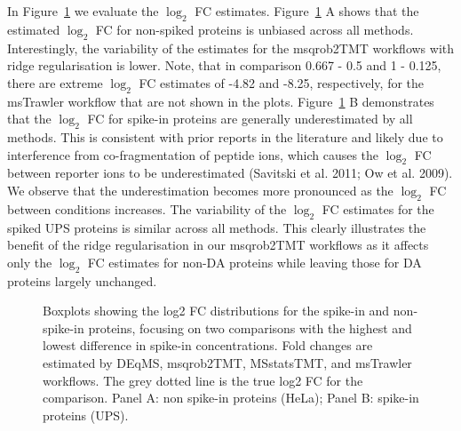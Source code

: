 \documentclass[
  letterpaper,
  DIV=11,
  numbers=noendperiod]{scrartcl}
\begin{document}
In Figure~\ref{fig-fold_change_spike} we evaluate the \(\log_2\) FC
estimates. Figure~\ref{fig-fold_change_spike} A shows that the estimated
\(\log_2\) FC for non-spiked proteins is unbiased across all methods.
Interestingly, the variability of the estimates for the msqrob2TMT
workflows with ridge regularisation is lower. Note, that in comparison
0.667 - 0.5 and 1 - 0.125, there are extreme \(\log_2\) FC estimates of
-4.82 and -8.25, respectively, for the msTrawler workflow that are not
shown in the plots. Figure~\ref{fig-fold_change_spike} B demonstrates
that the \(\log_2\) FC for spike-in proteins are generally
underestimated by all methods. This is consistent with prior reports in
the literature and likely due to interference from co-fragmentation of
peptide ions, which causes the \(\log_2\) FC between reporter ions to be
underestimated (Savitski et al. 2011; Ow et al. 2009). We observe that
the underestimation becomes more pronounced as the \(\log_2\) FC between
conditions increases. The variability of the \(\log_2\) FC estimates for
the spiked UPS proteins is similar across all methods. This clearly
illustrates the benefit of the ridge regularisation in our msqrob2TMT
workflows as it affects only the \(\log_2\) FC estimates for non-DA
proteins while leaving those for DA proteins largely unchanged.

\begin{figure}[H]


\caption{\label{fig-fold_change_spike}Boxplots showing the log2 FC
distributions for the spike-in and non-spike-in proteins, focusing on
two comparisons with the highest and lowest difference in spike-in
concentrations. Fold changes are estimated by DEqMS, msqrob2TMT,
MSstatsTMT, and msTrawler workflows. The grey dotted line is the true
log2 FC for the comparison. Panel A: non spike-in proteins (HeLa); Panel
B: spike-in proteins (UPS).}

\end{figure}%
\end{document}
